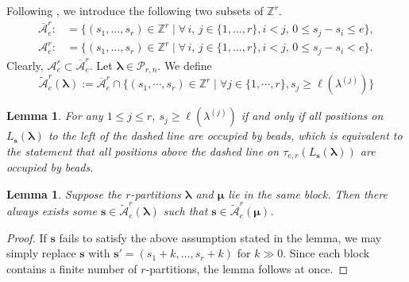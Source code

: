 \documentclass[a4paper,10pt]{amsart}
\theoremstyle{plain}
\def\bs{{\boldsymbol{s}}}
\def\blam{{\boldsymbol \lambda}}
\def\bmu{{\boldsymbol \mu}}
\theoremstyle{plain}
\newtheorem{lemma}[theorem]{Lemma}
\numberwithin{equation}{section}
\begin{document}
Following \cite{JL}, we introduce the following two subsets of $\mathbb{Z}^r$. $$\begin{aligned}
\overline{\mathcal A}^r_e:&=\{ (s_1, \dots, s_r) \in \mathbb{Z}^r \mid \forall\, i,\, j\in \{1,\dots,r\}, i<j,\, 0\le s_j-s_i\le e\},\\
{\mathcal A}^r_e:&=\{(s_1,\dots,s_r)\in \mathbb{Z}^r \mid \forall\, i,\, j\in \{1,\dots,r\}, i<j, \,0\le s_j-s_i<e\}.\end{aligned}
$$
Clearly, ${\mathcal A}^r_e\subset\overline{\mathcal A}^r_e$. Let $\blam\in\mathscr{P}_{r,n}$. We define
$$
\widetilde{\mathcal A}^r_e (\blam):=\overline{\mathcal A}^r_e \cap \{(s_1, \cdots, s_r) \in \mathbb Z^r \mid \forall j \in \{1, \cdots, r\}, s_j \ge \ell (\lambda^{(j)})\}
$$

\begin{lemma}\label{s_jge}
For any $1\le j\le r$, $s_j \ge \ell(\lambda^{(j)})$ if and only if all positions on $L_\bs (\blam)$ to the left of the dashed line are occupied by beads, which is equivalent to the statement that all positions above the dashed line on $\tau_{e, r}(L_\bs(\blam))$ are occupied by beads.
\end{lemma}

\begin{lemma}\label{adjustCharge} Suppose the $r$-partitions \(\boldsymbol{\lambda}\) and \(\boldsymbol{\mu}\) lie in the same block. Then there always exists some \(\boldsymbol{s} \in \widetilde{\mathcal A}^r_e (\boldsymbol{\lambda})\) such that \(\boldsymbol{s} \in \widetilde{\mathcal A}^r_e (\boldsymbol{\mu})\).
\end{lemma}
\begin{proof} If \(\boldsymbol{s}\) fails to satisfy the above assumption stated in the lemma, we may simply replace \(\boldsymbol{s}\) with \(\boldsymbol{s}' = (s_1+k, \dots, s_r+k)\) for $k\gg 0$. Since each block contains a finite number of $r$-partitions, the lemma follows at once.
\end{proof}
\end{document}
